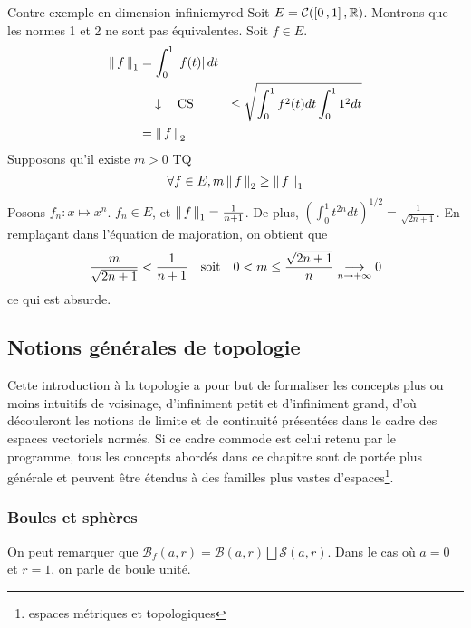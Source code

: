     \begin{omed}{Contre-exemple en dimension infinie}{myred}
        Soit $E = \mathcal{C}(\intervalleFF{0}{1}, \mathbb{R})$. Montrons que les normes 1 et 2 ne sont pas équivalentes. Soit $f \in E$. 
        \begin{align*}
            \nnorm{1}{f} 
            &= \int_{0}^{1} \abs{f(t)} dt \\
            &\argu \text{CS}
            &\leq \sqrt{\int_{0}^{1} f^2(t) dt \int_{0}^{1} 1^2 dt} \\
            &= \nnorm{2}{f}
        \end{align*}
        Supposons qu’il existe $m > 0$ TQ 
        \[ \forall f \in E, m \nnorm{2}{f} \geq \nnorm{1}{f} \]   
        Posons $f_n : x \mapsto x^n$. $f_n \in E$, et $\nnorm{1}{f} = \frac{1}{n+1}$. De plus, $\left(\int_{0}^{1} t^{2n} dt\right)^{1 / 2} = \frac{1}{\sqrt{2n + 1}}$. En remplaçant dans l’équation de majoration, on obtient que 
        \[ \frac{m}{\sqrt{2n+1}} < \frac{1}{n+1} \esp{soit} 0 < m \leq \frac{\sqrt{2n+1}}{n} \limi{n}{+\infty} 0 \]   
        ce qui est absurde.
    \end{omed}

\subsection{Notions générales de topologie}

    Cette introduction à la topologie a pour but de formaliser les concepts plus ou moins intuitifs de voisinage, d’infiniment petit et d’infiniment grand, d’où découleront les notions de limite et de continuité présentées dans le cadre des espaces vectoriels normés. Si ce cadre commode est celui retenu par le programme, tous les concepts abordés dans ce chapitre sont de portée plus générale et peuvent être étendus à des familles plus vastes d’espaces\footnote[2]{espaces métriques et topologiques}.

    \subsubsection{Boules et sphères}

    \begin{defi}{}{}
        
    \end{defi}

    On peut remarquer que $\mathcal{B}_f(a,r) = \mathcal{B}(a,r) \bigsqcup \mathcal{S}(a,r)$. Dans le cas où $a = 0$ et $r = 1$, on parle de boule unité.


